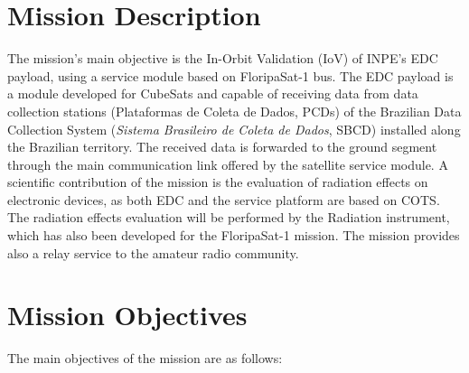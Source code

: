 \section{Mission Description}
The mission's main objective is the In-Orbit Validation (IoV) of INPE's EDC payload, using a service module based on FloripaSat-1 bus. The EDC payload is a module developed for CubeSats and capable of receiving data from data collection stations (Plataformas de Coleta de Dados, PCDs) of the Brazilian Data Collection System (\textit{Sistema Brasileiro de Coleta de Dados}, SBCD) installed along the Brazilian territory. The received data is forwarded to the ground segment through the main communication link offered by the satellite service module. A scientific contribution of the mission is the evaluation of radiation effects on electronic devices, as both EDC and the service platform are based on COTS. The radiation effects evaluation will be performed by the Radiation instrument, which has also been developed for the FloripaSat-1 mission. The mission provides also a relay service to the amateur radio community.



\section{Mission Objectives}

The main objectives of the mission are as follows:

